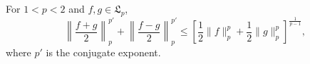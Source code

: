 For $1 < p < 2$ and $f, g \in \mathfrak{L}_p$,
$$\left\| \frac{f + g}{2} \right\|_p^{p'} + \left\| \frac{f - g}{2} \right\|_p^{p'} \leq \left[ \frac{1}{2} \|f\|_p^p + \frac{1}{2} \|g\|_p^p \right]^{\frac{1}{p-1}},$$
where $p'$ is the conjugate exponent.
